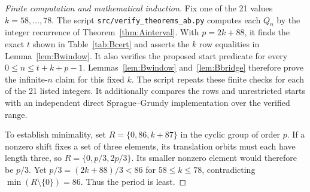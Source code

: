 \begin{proof}[Finite computation and mathematical induction]
Fix one of the 21 values $k=58,\ldots,78$. The script \texttt{src/verify\_theorems\_ab.py} computes each $Q_n$ by the integer recurrence of Theorem~\ref{thm:Ainterval}. With $p=2k+88$, it finds the exact $t$ shown in Table~\ref{tab:Bcert} and asserts the $k$ row equalities in Lemma~\ref{lem:Bwindow}. It also verifies the proposed start predicate for every $0\le n\le t+k+p-1$. Lemmas~\ref{lem:Bwindow} and~\ref{lem:Bbridge} therefore prove the infinite-$n$ claim for this fixed $k$. The script repeats these finite checks for each of the 21 listed integers. It additionally compares the rows and unrestricted starts with an independent direct Sprague--Grundy implementation over the verified range.

To establish minimality, set $R=\{0,86,k+87\}$ in the cyclic group of order $p$. If a nonzero shift fixes a set of three elements, its translation orbits must each have length three, so $R=\{0,p/3,2p/3\}$. Its smaller nonzero element would therefore be $p/3$. Yet $p/3=(2k+88)/3<86$ for $58\le k\le78$, contradicting $\min(R\setminus\{0\})=86$. Thus the period is least.
\end{proof}
